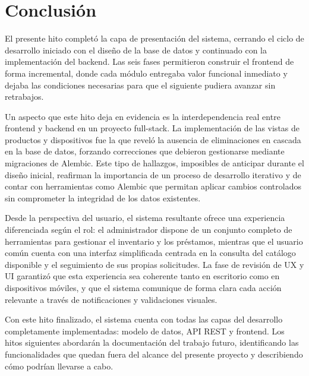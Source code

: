 \section{Conclusión}

El presente hito completó la capa de presentación del sistema, cerrando el ciclo de 
desarrollo iniciado con el diseño de la base de datos y continuado con la 
implementación del backend. Las seis fases permitieron construir el frontend de 
forma incremental, donde cada módulo entregaba valor funcional inmediato y dejaba 
las condiciones necesarias para que el siguiente pudiera avanzar sin retrabajos.

Un aspecto que este hito deja en evidencia es la interdependencia real entre 
frontend y backend en un proyecto full-stack. La implementación de las vistas de 
productos y dispositivos fue la que reveló la ausencia de eliminaciones en cascada 
en la base de datos, forzando correcciones que debieron gestionarse mediante 
migraciones de Alembic. Este tipo de hallazgos, imposibles de anticipar durante el 
diseño inicial, reafirman la importancia de un proceso de desarrollo iterativo y de 
contar con herramientas como Alembic que permitan aplicar cambios controlados sin 
comprometer la integridad de los datos existentes.

Desde la perspectiva del usuario, el sistema resultante ofrece una experiencia 
diferenciada según el rol: el administrador dispone de un conjunto completo de 
herramientas para gestionar el inventario y los préstamos, mientras que el usuario 
común cuenta con una interfaz simplificada centrada en la consulta del catálogo 
disponible y el seguimiento de sus propias solicitudes. La fase de revisión de UX y 
UI garantizó que esta experiencia sea coherente tanto en escritorio como en 
dispositivos móviles, y que el sistema comunique de forma clara cada acción 
relevante a través de notificaciones y validaciones visuales.

Con este hito finalizado, el sistema cuenta con todas las capas del desarrollo 
completamente implementadas: modelo de datos, API REST y frontend. Los hitos 
siguientes abordarán la documentación del trabajo futuro, identificando las 
funcionalidades que quedan fuera del alcance del presente proyecto y describiendo 
cómo podrían llevarse a cabo.